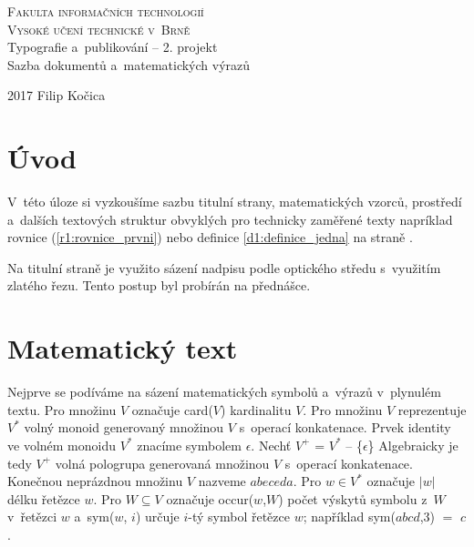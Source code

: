\documentclass[11pt, titlepage, a4paper, twocolumn]{article}
\theoremstyle{definition}
\theoremstyle{plain}
\begin{document}
		\begin{titlepage}
    \begin{center}
		\Huge{\textsc{Fakulta informačních technologií\\
		Vysoké učení technické v~Brně}\\}
		\LARGE{Typografie a~publikování -- 2. projekt\\
		Sazba dokumentů a~matematických výrazů\\}
		\end{center}
		\Large{2017 \hfill Filip Kočica}
		\end{titlepage}

    \section*{Úvod}
        V~této úloze si vyzkoušíme sazbu titulní strany, matematických vzorců, prostředí a~dalších textových
        struktur obvyklých pro technicky zaměřené texty napríklad rovnice (\ref{r1:rovnice_prvni}) nebo definice
        \ref{d1:definice_jedna} na straně \pageref{d1:definice_jedna}.

        Na titulní straně je využito sázení nadpisu podle optického středu s~využitím zlatého řezu. Tento postup
        byl probírán na přednášce.
    \par
    \section{Matematický text}
        Nejprve se podíváme na sázení matematických symbolů a~výrazů v~plynulém textu. Pro množinu $V$ označuje
        card($V$) kardinalitu $V$. Pro množinu $V$ reprezentuje $V^*$ volný monoid generovaný množinou $V$
        s~operací konkatenace. Prvek identity ve volném monoidu $V^*$ znacíme symbolem $\epsilon$.
        Nechť $V^+$ = $V^*$ -- \{$\epsilon$\} Algebraicky je tedy $V^+$ volná pologrupa generovaná množinou $V$
        s~operací konkatenace. Konečnou neprázdnou množinu $V$ nazveme $abeceda$. Pro $w \in V^*$ označuje
				$|w|$ délku řetězce $w$. Pro $W \subseteq V$ označuje occur($w$,$W$) počet výskytů symbolu z~$W$
				v~řetězci $w$ a~sym($w$, $i$) určuje $i$-tý symbol řetězce $w$; například sym($abcd$,3) $=$ $c$.
\end{document}
